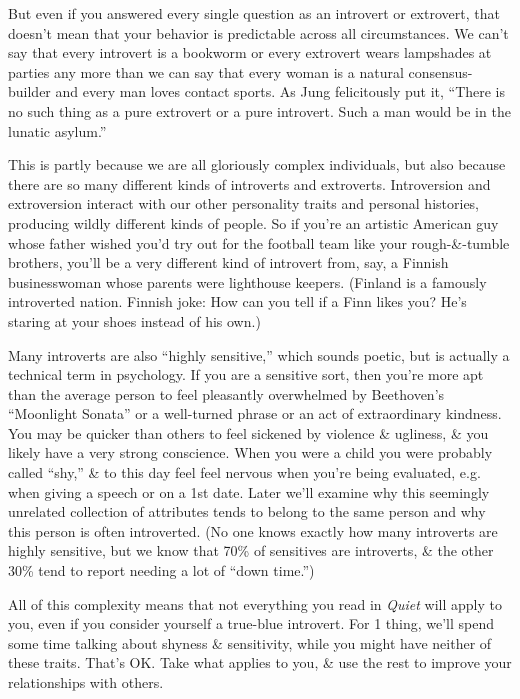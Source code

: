 \documentclass{article}
\numberwithin{equation}{section}
\begin{document}
But even if you answered every single question as an introvert or extrovert, that doesn't mean that your behavior is predictable across all circumstances. We can't say that every introvert is a bookworm or every extrovert wears lampshades at parties any more than we can say that every woman is a natural consensus-builder and every man loves contact sports. As Jung felicitously put it, ``There is no such thing as a pure extrovert or a pure introvert. Such a man would be in the lunatic asylum.''

This is partly because we are all gloriously complex individuals, but also because there are so many different kinds of introverts and extroverts. Introversion and extroversion interact with our other personality traits and personal histories, producing wildly different kinds of people. So if you're an artistic American guy whose father wished you'd try out for the football team like your rough-\&-tumble brothers, you'll be a very different kind of introvert from, say, a Finnish businesswoman whose parents were lighthouse keepers. (Finland is a famously introverted nation. Finnish joke: How can you tell if a Finn likes you? He's staring at your shoes instead of his own.)

Many introverts are also ``highly sensitive,'' which sounds poetic, but is actually a technical term in psychology. If you are a sensitive sort, then you're more apt than the average person to feel pleasantly overwhelmed by Beethoven's ``Moonlight Sonata'' or a well-turned phrase or an act of extraordinary kindness. You may be quicker than others to feel sickened by violence \& ugliness, \& you likely have a very strong conscience. When you were a child you were probably called ``shy,'' \& to this day feel feel nervous when you're being evaluated, e.g. when giving a speech or on a 1st date. Later we'll examine why this seemingly unrelated collection of attributes tends to belong to the same person and why this person is often introverted. (No one knows exactly how many introverts are highly sensitive, but we know that 70\% of sensitives are introverts, \& the other 30\% tend to report needing a lot of ``down time.'')

All of this complexity means that not everything you read in \textit{Quiet} will apply to you, even if you consider yourself a true-blue introvert. For 1 thing, we'll spend some time talking about shyness \& sensitivity, while you might have neither of these traits. That's OK. Take what applies to you, \& use the rest to improve your relationships with others.
\end{document}
